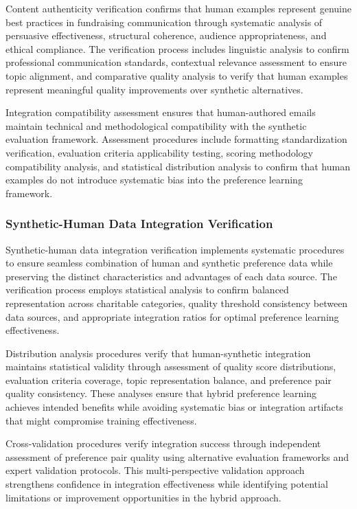 Content authenticity verification confirms that human examples represent genuine best practices in fundraising communication through systematic analysis of persuasive effectiveness, structural coherence, audience appropriateness, and ethical compliance. The verification process includes linguistic analysis to confirm professional communication standards, contextual relevance assessment to ensure topic alignment, and comparative quality analysis to verify that human examples represent meaningful quality improvements over synthetic alternatives.

Integration compatibility assessment ensures that human-authored emails maintain technical and methodological compatibility with the synthetic evaluation framework. Assessment procedures include formatting standardization verification, evaluation criteria applicability testing, scoring methodology compatibility analysis, and statistical distribution analysis to confirm that human examples do not introduce systematic bias into the preference learning framework.

\subsubsection{Synthetic-Human Data Integration Verification}

Synthetic-human data integration verification implements systematic procedures to ensure seamless combination of human and synthetic preference data while preserving the distinct characteristics and advantages of each data source. The verification process employs statistical analysis to confirm balanced representation across charitable categories, quality threshold consistency between data sources, and appropriate integration ratios for optimal preference learning effectiveness.

Distribution analysis procedures verify that human-synthetic integration maintains statistical validity through assessment of quality score distributions, evaluation criteria coverage, topic representation balance, and preference pair quality consistency. These analyses ensure that hybrid preference learning achieves intended benefits while avoiding systematic bias or integration artifacts that might compromise training effectiveness.

Cross-validation procedures verify integration success through independent assessment of preference pair quality using alternative evaluation frameworks and expert validation protocols. This multi-perspective validation approach strengthens confidence in integration effectiveness while identifying potential limitations or improvement opportunities in the hybrid approach.

